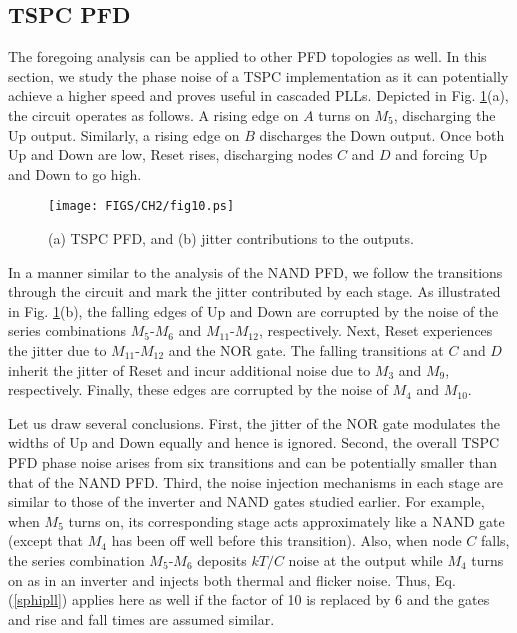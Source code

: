 \subsection{TSPC PFD}
The foregoing analysis can be applied to other PFD topologies as well. In this section, we study the phase noise of a TSPC
implementation \cite{tspcpfd} as it can potentially achieve a higher speed and proves useful in cascaded PLLs. Depicted in Fig.
\ref{fig:pfdtspc}(a), the circuit operates as follows. A rising edge on $A$ turns on $M_5$, discharging the Up output. Similarly,
a rising edge on $B$ discharges the Down output. Once both Up and Down are low, Reset rises, discharging nodes
$C$ and $D$ and forcing Up and Down to go high.

\begin{figure}[htb!]
\centering
\texttt{[image: FIGS/CH2/fig10.ps]}
\caption{(a) TSPC PFD, and (b) jitter contributions to the outputs.}
\label{fig:pfdtspc}
\end{figure}

In a manner similar to the analysis of the NAND PFD, we follow the transitions through the circuit and mark the jitter
contributed by each stage. As illustrated in Fig. \ref{fig:pfdtspc}(b), the falling edges of Up and Down are corrupted by the
noise of the series combinations $M_5$-$M_6$ and $M_{11}$-$M_{12}$, respectively. Next, Reset experiences the jitter
due to $M_{11}$-$M_{12}$ and the NOR gate. The falling transitions at $C$ and $D$ inherit the jitter of Reset and incur
additional noise due to $M_3$ and $M_9$, respectively. Finally, these edges are corrupted by the noise of $M_4$ and
$M_{10}$.

Let us draw several conclusions. First, the jitter of the NOR gate modulates the widths of Up and Down equally and hence
is ignored. Second, the overall TSPC PFD phase noise arises from six transitions and can be potentially smaller than that
of the NAND PFD. Third, the noise injection mechanisms in each stage are similar to those of the inverter and NAND gates
studied earlier. For example, when $M_5$ turns on, its corresponding stage acts approximately like a NAND gate (except
that $M_4$ has been off well before this transition). Also, when node $C$ falls, the series combination 
$M_5$-$M_6$ deposits $kT/C$ noise at the output while $M_4$ turns on as in an inverter and injects both thermal and
flicker noise. Thus, Eq. (\ref{sphipll}) applies here as well if the factor of 10 is replaced by 6 and the gates and rise and fall times are assumed
similar.



